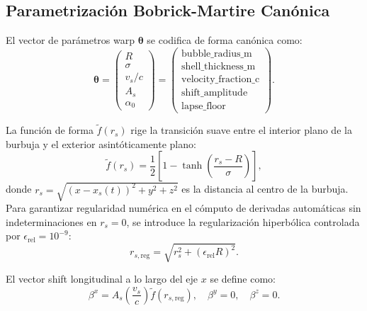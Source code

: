 \documentclass[11pt,a4paper]{article}
\begin{document}
\subsection{Parametrización Bobrick-Martire Canónica}
El vector de parámetros warp $\boldsymbol{\theta}$ se codifica de forma canónica como:
\begin{equation}
    \boldsymbol{\theta} = \begin{pmatrix} R \\ \sigma \\ v_s / c \\ A_s \\ \alpha_0 \end{pmatrix} = \begin{pmatrix} \text{bubble\_radius\_m} \\ \text{shell\_thickness\_m} \\ \text{velocity\_fraction\_c} \\ \text{shift\_amplitude} \\ \text{lapse\_floor} \end{pmatrix}.
\end{equation}

La función de forma $\tilde{f}(r_s)$ rige la transición suave entre el interior plano de la burbuja y el exterior asintóticamente plano:
\begin{equation}
    \tilde{f}(r_s) = \frac{1}{2} \left[ 1 - \tanh\left( \frac{r_s - R}{\sigma} \right) \right],
\end{equation}
donde $r_s = \sqrt{(x - x_s(t))^2 + y^2 + z^2}$ es la distancia al centro de la burbuja. Para garantizar regularidad numérica en el cómputo de derivadas automáticas sin indeterminaciones en $r_s = 0$, se introduce la regularización hiperbólica controlada por $\epsilon_{\text{rel}} = 10^{-9}$:
\begin{equation}
    r_{s, \text{reg}} = \sqrt{r_s^2 + (\epsilon_{\text{rel}} R)^2}.
\end{equation}

El vector shift longitudinal a lo largo del eje $x$ se define como:
\begin{equation}
    \beta^x = A_s \left(\frac{v_s}{c}\right) \tilde{f}(r_{s, \text{reg}}), \quad \beta^y = 0, \quad \beta^z = 0.
\end{equation}
\end{document}
